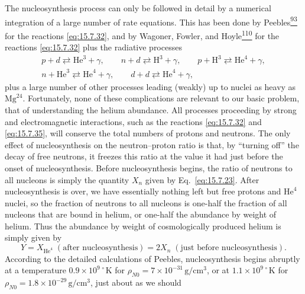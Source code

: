 The nucleosynthesis process can only be followed in detail by a numerical
integration of a large number of rate equations. This has been done by
Peebles\hyperref[ch15-ref-93]{\textsuperscript{93}} for the reactions
\eqref{eq:15.7.32}, and by Wagoner, Fowler, and
Hoyle\hyperref[ch15-ref-110]{\textsuperscript{110}} for the reactions
\eqref{eq:15.7.32} plus the radiative processes
\begin{equation}
  \begin{gathered}
    p+d\rightleftarrows\mathrm{He}^3+\gamma,
    \qquad
    n+d\rightleftarrows\mathrm H^3+\gamma,
    \qquad
    p+\mathrm H^3\rightleftarrows\mathrm{He}^4+\gamma,
    \\
    n+\mathrm{He}^3\rightleftarrows\mathrm{He}^4+\gamma,
    \qquad
    d+d\rightleftarrows\mathrm{He}^4+\gamma,
  \end{gathered}
  \tag{15.7.35}\label{eq:15.7.35}
\end{equation}
plus a large number of other processes leading (weakly) up to nuclei as heavy
as \(\mathrm{Mg}^{24}\). Fortunately, none of these complications are
relevant to our basic problem, that of understanding the helium abundance.
All processes proceeding by strong and electromagnetic interactions, such as
the reactions \eqref{eq:15.7.32} and \eqref{eq:15.7.35}, will conserve the
total numbers of protons and neutrons. The only effect of nucleosynthesis on
the neutron--proton ratio is that, by ``turning off'' the decay of free
neutrons, it freezes this ratio at the value it had just before the onset of
nucleosynthesis. Before nucleosynthesis begins, the ratio of neutrons to all
nucleons is simply the quantity \(X_n\) given by Eq.~\eqref{eq:15.7.23}.
After nucleosynthesis is over, we have essentially nothing left but free
protons and \(\mathrm{He}^4\) nuclei, so the fraction of neutrons to all
nucleons is one-half the fraction of all nucleons that are bound in helium,
or one-half the abundance by weight of helium. Thus the abundance by weight of
cosmologically produced helium is simply given by
\begin{equation}
  Y
  =
  X_{\mathrm{He}^4}\;(\text{after nucleosynthesis})
  =
  2X_n\;(\text{just before nucleosynthesis}).
  \tag{15.7.36}\label{eq:15.7.36}
\end{equation}
According to the detailed calculations of Peebles, nucleosynthesis begins
abruptly at a temperature \(0.9\times10^{9\,\circ}\mathrm K\) for
\(\rho_{N0}=7\times10^{-31}\,\mathrm{g/cm^3}\), or at
\(1.1\times10^{9\,\circ}\mathrm K\) for
\(\rho_{N0}=1.8\times10^{-29}\,\mathrm{g/cm^3}\), just about as we should

